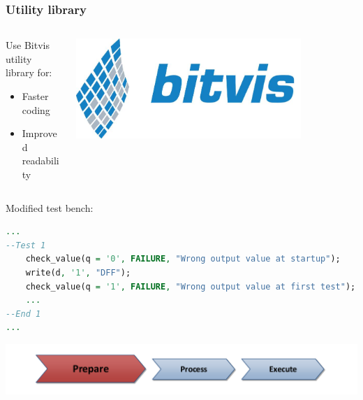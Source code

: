 \documentclass[british,10pt]{beamer}
\begin{document}
\begin{frame}[fragile]\frametitle{Utility library}
\vskip30pt
\begin{columns}
\begin{column}{0.6\textwidth}
Use Bitvis utility library for:
\begin{itemize}
\item Faster coding
\item Improved readability
\end{itemize}
\end{column}
\includegraphics[width=0.8\textwidth]{images/bitvis.png}
\end{columns}
\vskip10pt
Modified test bench:
\begin{lstlisting}[language=VHDL, tabsize=4, frame=single, framesep=2mm, belowskip=5pt, aboveskip=5pt, showstringspaces=false, basicstyle=\scriptsize]
...
--Test 1
    check_value(q = '0', FAILURE, "Wrong output value at startup");
    write(d, '1', "DFF");
    check_value(q = '1', FAILURE, "Wrong output value at first test");
    ...
--End 1
...
\end{lstlisting}
\vskip25pt
\begin{center}
\includegraphics[width=.7\textwidth]{images/ppe1.pdf}
\end{center}
\end{frame}
\end{document}
